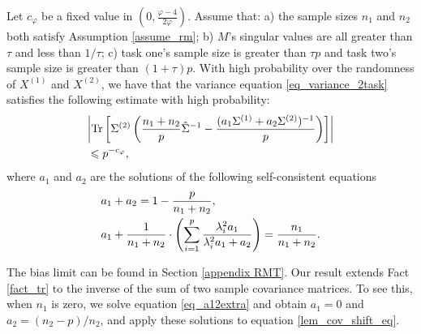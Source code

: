 \begin{theorem}\label{thm_main_RMT}
	Let $c_{\varphi}$ be a fixed value in $(0, \frac{\varphi - 4}{2\varphi})$.
	Assume that: a) the sample sizes $n_1$ and $n_2$ both satisfy Assumption \ref{assume_rm};
	b) $M$'s singular values are all greater than $\tau$ and less than $1/\tau$;
	c) task one's sample size is greater than $\tau p$ and task two's sample size is greater than $(1 + \tau) p$.
	With high probability over the randomness of $X^{(1)}$ and $X^{(2)}$, we have that
	the variance equation \eqref{eq_variance_2task} satisfies the following estimate with high probability:
			\begin{align}\label{lem_cov_shift_eq}
				&\bigabs{\bigtr{\Sigma^{(2)} \bigbrace{\frac{n_1 + n_2}p{\hat{\Sigma}^{-1}} - \frac{(a_1 \Sigma^{(1)} + a_2 \Sigma^{(2)})^{-1}}{p} }}} \nonumber \\
			&\le  p^{-c_{\varphi}}, %
			\end{align}
			where $a_1$ and $a_2$ are the solutions of the following self-consistent equations
			\begin{align}
				&a_1 + a_2 = 1- \frac{p}{n_1 + n_2},\\
				&a_1 + \frac1{n_1 + n_2}\cdot \left({\sum_{i=1}^p \frac{\lambda_i^2 a_1}{\lambda_i^2 a_1 + a_2}}\right) = \frac{n_1}{n_1 + n_2}. \label{eq_a12extra}
			\end{align}
\end{theorem}
The bias limit can be found in Section \ref{appendix RMT}.
Our result extends Fact \ref{fact_tr} to the inverse of the sum of two sample covariance matrices.
To see this, when $n_1$ is zero, we solve equation \eqref{eq_a12extra} and obtain $a_1 = 0$ and $a_2 = (n_2-p) / n_2$, and apply these solutions to equation \eqref{lem_cov_shift_eq}.

